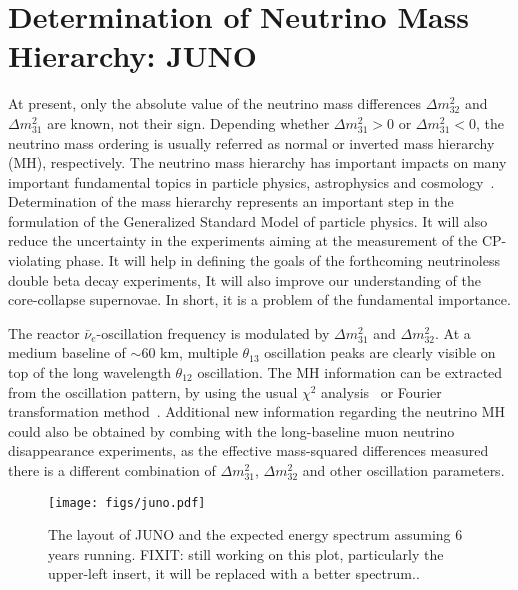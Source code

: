 \newcommand{\fixit}[1]{{\color{red}FIXIT: #1}}
\section{Determination of Neutrino Mass Hierarchy: JUNO}

At present, only the absolute value of the neutrino mass differences $\Delta m^2_{32}$ and $\Delta m^2_{31}$ are known, not their sign. Depending whether $\Delta m^2_{31}>0$ or $\Delta m^2_{31}<0$, the neutrino mass ordering is usually referred as normal or inverted mass hierarchy (MH), respectively. The neutrino mass hierarchy has important impacts on many important fundamental topics in particle physics, astrophysics and cosmology~\cite{MHwhitepaper}. Determination of the mass hierarchy represents an important step in the formulation of the Generalized Standard Model of particle physics. It will also reduce the uncertainty in the experiments aiming at the measurement of the CP-violating phase. It will help in defining the goals of the forthcoming neutrinoless double beta decay experiments, It will also improve our understanding of the core-collapse supernovae. In short, it is a problem of the fundamental importance.

The reactor $\bar\nu_e$-oscillation frequency is modulated by $\Delta m^2_{31}$ and $\Delta m^2_{32}$. At a medium baseline of $\sim$60 km, multiple $\theta_{13}$ oscillation peaks are clearly visible on top of the long wavelength $\theta_{12}$ oscillation.
The MH information can be extracted from the oscillation pattern, by using the usual $\chi^2$ analysis~\cite{Li-PRD13} or Fourier transformation method~\cite{Zhan-PRD08,Zhan-PRD09}. Additional new information regarding the neutrino MH could also be obtained by combing with the long-baseline muon neutrino disappearance experiments, as the effective mass-squared differences measured there is a different combination of $\Delta m^2_{31}$, $\Delta m^2_{32}$ and other oscillation parameters.

\begin{figure}[!htb] \label{fig:juno}
  \centering
  \texttt{[image: figs/juno.pdf]}
  \caption{The layout of JUNO and the expected energy spectrum assuming 6 years running. \fixit{still working on this plot, particularly the upper-left insert, it will be replaced with a better spectrum.}. }
\end{figure}

